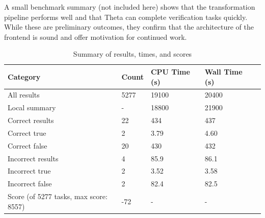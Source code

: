 A small benchmark summary (not included here) shows that the transformation pipeline performs well and that Theta can complete verification tasks quickly. While these are preliminary outcomes, they confirm that the architecture of the frontend is sound and offer motivation for continued work.

\begin{table}[]
\centering
\begin{tabular}{@{}lllll@{}}
\toprule
Category                     & Count & CPU Time (s) & Wall Time (s) \\ \midrule
All results                           & 5277  & 19100        & 20400         \\
Local summary                         & -     & 18800        & 21900         \\
\quad Correct results                      & 22    & 434          & 437           \\
\quad\quad Correct true                     & 2     & 3.79         & 4.60          \\
\quad\quad Correct false                    & 20    & 430          & 432           \\
\quad Incorrect results                    & 4     & 85.9         & 86.1          \\
\quad\quad Incorrect true                   & 2     & 3.52         & 3.58          \\
\quad\quad Incorrect false                  & 2     & 82.4         & 82.5          \\
Score (of 5277 tasks, max score: 8557)  & -72   & -            & -             \\ \bottomrule
\end{tabular}
\caption{Summary of results, times, and scores}
\end{table}

